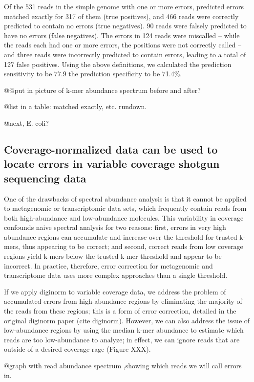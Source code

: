 Of the 531 reads in the simple genome with one or more errors,
predicted errors matched exactly for 317 of them (true positives), and
466 reads were correctly predicted to contain no errors (true
negatives). 90 reads were falsely predicted to have no errors (false
negatives). The errors in 124 reads were miscalled -- while the reads
each had one or more errors, the positions were not correctly called
-- and three reads were incorrectly predicted to contain errors,
leading to a total of 127 false positives.  Using the above
definitions, we calculated the prediction sensitivity to be 77.9%
the prediction specificity to be 71.4\%.

@@put in picture of k-mer abundance spectrum before and after?

@list in a table: matched exactly, etc. rundown.

@next, E. coli?

\subsection{Coverage-normalized data can be used to locate errors in variable
coverage shotgun sequencing data}

One of the drawbacks of spectral abundance analysis is that it cannot
be applied to metagenomic or transcriptomic data sets, which
frequently contain reads from both high-abundance and low-abundance
molecules.  This variability in coverage confounds naive spectral
analysis for two reasons: first, errors in very high abundance regions
can accumulate and increase over the threshold for trusted k-mers,
thus appearing to be correct; and second, correct reads from low
coverage regions yield k-mers below the trusted k-mer threshold and
appear to be incorrect.  In practice, therefore, error correction for
metagenomic and transcriptome data uses more complex approaches than a
single threshold.

If we apply diginorm to variable coverage data, we address the problem
of accumulated errors from high-abundance regions by eliminating the
majority of the reads from these regions; this is a form of error
correction, detailed in the original diginorm paper (cite diginorm).
However, we can also address the issue of low-abundance regions by
using the median k-mer abundance to estimate which reads are too
low-abundance to analyze; in effect, we can ignore reads that are
outside of a desired coverage rage (Figure XXX).

@graph with read abundance spectrum ,showing which reads we will
call errors in.

